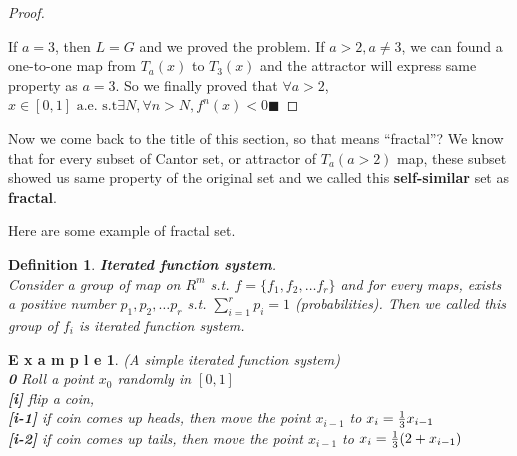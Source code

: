 \documentclass[12pt]{article}
\theoremstyle{plain}
\newtheorem{definition}{{\color{red}\textbf{Definition}}}[section]
\newtheorem{proof}{\textit{PROOF}}[section]
\newtheorem{example}{\textbf{E x a m p l e}}[section]
\begin{document}
{\begin{proof}
{
}

  \noindent If $a = 3$, then $L = G$ and we proved the problem. If $a > 2, a \neq 3$, we can found a one-to-one map from $T_a(x)$ to $T_3(x)$ and the attractor will express same property as $a = 3$. So we finally proved that $\forall a > 2$, $x \in[0 ,1] \text{ a.e. s.t} \exists N, \forall n > N, f^n(x) < 0 \blacksquare$

\end{proof}
}

Now we come back to the title of this section, so that means ``fractal''? We know that for every subset of Cantor set, or attractor of $T_a (a>2)$ map, these subset showed us same property of the original set and we called this \textbf{self-similar} set as \textbf{fractal}.

Here are some example of fractal set.

\begin{definition}\textbf{Iterated function system}.
\\\noindent Consider a group of map on $R^m$ s.t. $f = \{f_1, f_2, \ldots f_r\}$ and for every maps, exists a positive number $p_1, p_2, \ldots p_r$ s.t. $\sum_{i = 1}^{r} p_i = 1$ (probabilities). Then we called this group of $f_i$ is iterated function system.
\end{definition}

\begin{example} (A simple iterated function system)
\\\noindent \textbf{0} Roll a point $x_0$ randomly in $[0, 1]$
\\\noindent \textbf{[i]} flip a coin, 
\\\noindent \textbf{[i-1]} if coin comes up heads, then move the point $x_{i-1}$ to $x_i = {1\over 3} x_{i-1}$
\\\noindent \textbf{[i-2]} if coin comes up tails, then move the point $x_{i-1}$ to $x_i = {1 \over 3}(2 + x_{i-1})$
\end{example}
\end{document}
